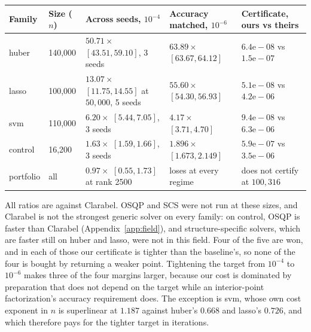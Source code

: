 \documentclass[11pt]{article}
\begin{document}
\begin{center}
\small
\begin{tabular}{p{1.9cm}p{1.9cm}p{2.9cm}p{2.9cm}p{3.2cm}}
\toprule
Family & Size ($n$) & Across seeds, $10^{-4}$ & Accuracy matched, $10^{-6}$ & Certificate, ours vs theirs \\
\midrule
huber & 140{,}000 & $50.71\times$ $[43.51, 59.10]$, 3 seeds & $63.89\times$ $[63.67, 64.12]$ & $6.4\mathrm{e}{-}08$ vs $1.5\mathrm{e}{-}07$ \\
\addlinespace
lasso & 100{,}000 & $13.07\times$ $[11.75, 14.55]$ at $50{,}000$, 5 seeds & $55.60\times$ $[54.30, 56.93]$ & $5.1\mathrm{e}{-}08$ vs $4.2\mathrm{e}{-}06$ \\
\addlinespace
svm & 110{,}000 & $6.20\times$ $[5.44, 7.05]$, 3 seeds & $4.17\times$ $[3.71, 4.70]$ & $9.4\mathrm{e}{-}08$ vs $6.3\mathrm{e}{-}06$ \\
\addlinespace
control & 16{,}200 & $1.63\times$ $[1.59, 1.66]$, 3 seeds & $1.896\times$ $[1.673, 2.149]$ & $5.9\mathrm{e}{-}07$ vs $3.5\mathrm{e}{-}06$ \\
\addlinespace
portfolio & all & $0.97\times$ $[0.55, 1.73]$ at rank 2500 & loses at every regime & does not certify at $100{,}316$ \\
\bottomrule
\end{tabular}
\end{center}

All ratios are against Clarabel. OSQP and SCS were not run at these sizes, and
Clarabel is not the strongest generic solver on every family: on control, OSQP
is faster than Clarabel (Appendix~\ref{app:field}), and structure-specific
solvers, which are faster still on huber and lasso, were not in this field. Four of the five are won, and in each of those our certificate is
tighter than the baseline's, so none of the four is bought by returning a
weaker point. Tightening the target from $10^{-4}$ to $10^{-6}$ makes three of
the four margins larger, because our cost is dominated by preparation that does
not depend on the target while an interior-point factorization's accuracy
requirement does. The exception is svm, whose own cost exponent in $n$ is
superlinear at $1.187$ against huber's $0.668$ and lasso's $0.726$, and which
therefore pays for the tighter target in iterations.
\end{document}
